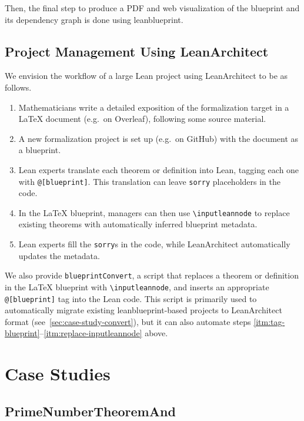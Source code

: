 \documentclass{article}
\newcommand{\leanarchitect}{LeanArchitect\xspace}
\newcommand{\leanblueprint}{leanblueprint\xspace}
\newcommand\bplatexcode{\lstinline[language={[latex]tex},keywordstyle=\ttfamily\color{keywordcolor},moretexcs={inputleannode,inputleanmodule}]}
\newcommand\leancode{\lstinline[language=lean]}
\begin{document}
Then, the final step to produce a PDF and web visualization of the blueprint and its dependency graph is done using \leanblueprint.

\subsection{Project Management Using \leanarchitect}
We envision the workflow of a large Lean project using \leanarchitect to be as follows.

\begin{enumerate}
\item Mathematicians write a detailed exposition of the formalization target in a \LaTeX{} document (e.g.\ on Overleaf), following some source material.
\item A new formalization project is set up (e.g.\ on GitHub) with the document as a blueprint.
\item \label{itm:tag-blueprint} Lean experts translate each theorem or definition into Lean, tagging each one with \leancode{@[blueprint]}. This translation can leave \leancode{sorry} placeholders in the code.
\item \label{itm:replace-inputleannode} In the \LaTeX{} blueprint, managers can then use \bplatexcode{\inputleannode} to replace existing theorems with automatically inferred blueprint metadata.
\item Lean experts fill the \leancode{sorry}s in the code, while \leanarchitect automatically updates the metadata.
\end{enumerate}

We also provide \leancode{blueprintConvert}, a script that replaces a theorem or definition in the \LaTeX{} blueprint with \bplatexcode{\inputleannode}, and inserts an appropriate \leancode{@[blueprint]} tag into the Lean code. This script is primarily used to automatically migrate existing \leanblueprint-based projects to \leanarchitect format (see~\cref{sec:case-study-convert}), but it can also automate steps \ref{itm:tag-blueprint}--\ref{itm:replace-inputleannode} above.

\section{Case Studies}

\subsection{PrimeNumberTheoremAnd}
\end{document}
